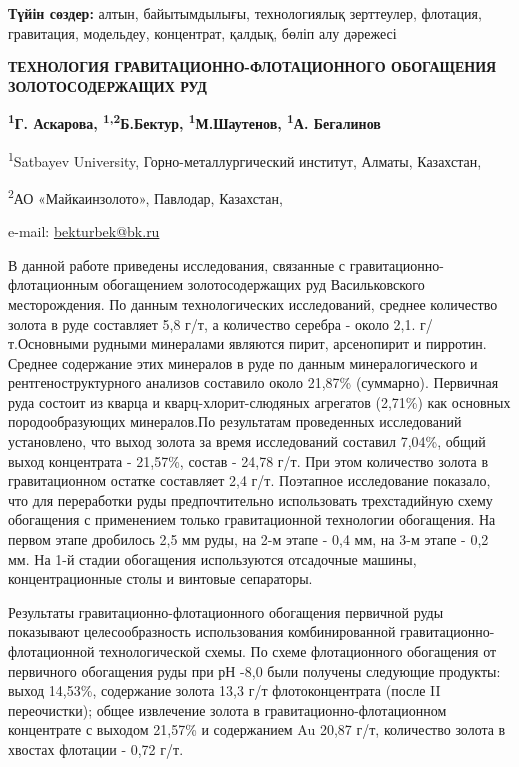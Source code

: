 {\bfseries Түйін сөздер:} алтын, байытымдылығы, технологиялық зерттеулер,
флотация, гравитация, модельдеу, концентрат, қалдық, бөліп алу дәрежесі
\begin{articleheader}

{\bfseries ТЕХНОЛОГИЯ ГРАВИТАЦИОННО-ФЛОТАЦИОННОГО ОБОГАЩЕНИЯ
ЗОЛОТОСОДЕРЖАЩИХ РУД}

{\bfseries \textsuperscript{1}Г. Аскарова,
\textsuperscript{1,2}Б.Бектур\textsuperscript{\envelope },
\textsuperscript{1}М.Шаутенов, \textsuperscript{1}А. Бегалинов}
\end{articleheader}
\begin{affiliation}
\textsuperscript{1}Satbayev University, Горно-металлургический институт,
Алматы, Казахстан,

\textsuperscript{2}АО «Майкаинзолото», Павлодар, Казахстан,

e-mail: \href{mailto:bekturbek@bk.run}{bekturbek@bk.ru}
\end{affiliation}

В данной работе приведены исследования, связанные с
гравитационно-флотационным обогащением золотосодержащих руд
Васильковского месторождения. По данным технологических исследований,
среднее количество золота в руде составляет 5,8 г/т, а количество
серебра - около 2,1. г/т.Основными рудными минералами являются пирит,
арсенопирит и пирротин. Среднее содержание этих минералов в руде по
данным минералогического и рентгеноструктурного анализов составило около
21,87\% (суммарно). Первичная руда состоит из кварца и
кварц-хлорит-слюдяных агрегатов (2,71\%) как основных породообразующих
минералов.По результатам проведенных исследований установлено, что выход
золота за время исследований составил 7,04\%, общий выход концентрата -
21,57\%, состав - 24,78 г/т. При этом количество золота в гравитационном
остатке составляет 2,4 г/т. Поэтапное исследование показало, что для
переработки руды предпочтительно использовать трехстадийную схему
обогащения с применением только гравитационной технологии обогащения. На
первом этапе дробилось 2,5 мм руды, на 2-м этапе - 0,4 мм, на 3-м этапе
- 0,2 мм. На 1-й стадии обогащения используются отсадочные машины,
концентрационные столы и винтовые сепараторы.

Результаты гравитационно-флотационного обогащения первичной руды
показывают целесообразность использования комбинированной
гравитационно-флотационной технологической схемы. По схеме флотационного
обогащения от первичного обогащения руды при рН -8,0 были получены
следующие продукты: выход 14,53\%, содержание золота 13,3 г/т
флотоконцентрата (после II переочистки); общее извлечение золота в
гравитационно-флотационном концентрате с выходом 21,57\% и содержанием
Au 20,87 г/т, количество золота в хвостах флотации - 0,72 г/т.

